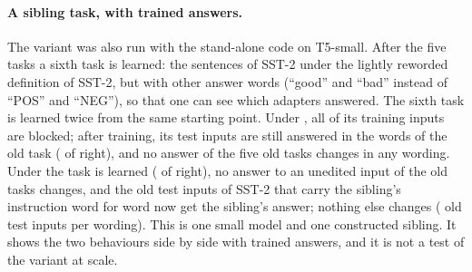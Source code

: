 \paragraph{A sibling task, with trained answers.} The variant \exactfirst{} was also run with the
stand-alone code on T5-small. After the five tasks a sixth task is learned: the sentences of SST-2
under the lightly reworded definition of SST-2, but with other answer words (``good'' and ``bad''
instead of ``POS'' and ``NEG''), so that one can see which adapters answered. The sixth task is
learned twice from the same starting point. Under \cert{}, all \SiblingCertBlocked{} of its
\SiblingTrain{} training inputs are blocked; after training, its test inputs are still answered in
the words of the old task (\SiblingCertRight{} of \SiblingTest{} right), and no answer of the five
old tasks changes in any wording. Under \exactfirst{} the task is learned (\SiblingExactRight{} of
\SiblingTest{} right), no answer to an unedited input of the old tasks changes, and the
\SiblingExactChangedLight{} old test inputs of SST-2 that carry the sibling's instruction word for
word now get the sibling's answer; nothing else changes (\SiblingOldInputs{} old test inputs per
wording). This is one small model and one constructed sibling. It shows the two behaviours side by
side with trained answers, and it is not a test of the variant at scale.



